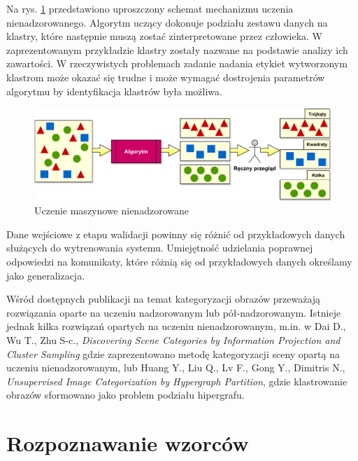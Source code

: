 Na rys. \ref{fig:unsupervised-learning} przedstawiono uproszczony schemat mechanizmu uczenia nienadzorowanego. Algorytm uczący dokonuje podziału zestawu danych na klastry, które następnie muszą zostać zinterpretowane przez człowieka. W zaprezentowanym przykładzie klastry zostały nazwane na podstawie analizy ich zawartości. W rzeczywistych problemach zadanie nadania etykiet wytworzonym klastrom może okazać się trudne i może wymagać dostrojenia parametrów algorytmu by identyfikacja klastrów była możliwa.

\begin{figure}[h]
	\centering
	\includegraphics[scale=0.77]{graphics/01_podstawy_teoretyczne/unsupervised-learning.pdf}
	\caption{Uczenie maszynowe nienadzorowane \cite{CASEY}}
	\label{fig:unsupervised-learning}
\end{figure}

Dane wejściowe z etapu walidacji powinny się różnić od przykładowych danych służących do wytrenowania systemu. Umiejętność udzielania poprawnej odpowiedzi na komunikaty, które różnią się od przykładowych danych określamy jako generalizacja.\cite{BISHOP06}

Wśród dostępnych publikacji na temat kategoryzacji obrazów przeważają rozwiązania oparte na uczeniu nadzorowanym lub pół-nadzorowanym.\cite{MELE06}\cite{CHEN04}\cite{Vitaladevuni13}\cite{LUO11} Istnieje jednak kilka rozwiązań opartych na uczeniu nienadzorowanym, m.in. w  Dai D., Wu T., Zhu S-c., \emph{Discovering Scene Categories by Information Projection and Cluster Sampling}\cite{DAI10} gdzie zaprezentowano metodę kategoryzacji sceny opartą na uczeniu nienadzorowanym, lub Huang Y., Liu Q., Lv F., Gong Y., Dimitris N., \emph{Unsupervised Image Categorization by Hypergraph Partition}\cite{HUANG11}, gdzie klastrowanie obrazów sformowano jako problem podziału hipergrafu.

\section{Rozpoznawanie wzorców}

